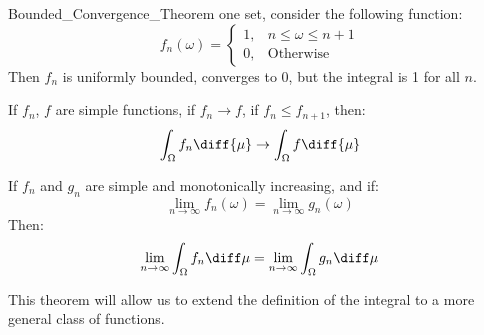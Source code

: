 \begin{lexample}{}{Bounded_Convergence_Theorem}
                    one set, consider the following function:
                    \begin{equation}
                        f_{n}(\omega)=
                        \begin{cases}
                            1,&n\leq\omega\leq{n+1}\\
                            0,&\textrm{Otherwise}
                        \end{cases}
                    \end{equation}
                    Then $f_{n}$ is uniformly bounded,
                    converges to $0$, but the integral is
                    1 for all $n$.
                \end{lexample}
                \begin{theorem}
                    If $f_{n}$, $f$ are simple functions, if
                    $f_{n}\rightarrow{f}$, if $f_{n}\leq{f}_{n+1}$,
                    then:
                    \begin{equation}
                        \int_{\Omega}f_{n}\diff{\mu}
                        \rightarrow\int_{\Omega}f\diff{\mu}
                    \end{equation}
                \end{theorem}
                \begin{theorem}
                    \label{thm:MEASURE_THEORY_LIM_INT_MONO_SIMPLE_FUNCS}
                    If $f_{n}$ and $g_{n}$ are simple and monotonically
                    increasing, and if:
                    \begin{equation}
                        \underset{n\rightarrow\infty}{\lim}f_{n}(\omega)
                        =\underset{n\rightarrow\infty}{\lim}g_{n}(\omega)
                    \end{equation}
                    Then:
                    \begin{equation}
                        \underset{n\rightarrow\infty}{\lim}
                        \int_{\Omega}f_{n}\diff\mu
                        =\underset{n\rightarrow\infty}{\lim}
                        \int_{\Omega}g_{n}\diff\mu
                    \end{equation}
                \end{theorem}
                This theorem will allow us to extend the definition
                of the integral to a more general class of functions.

